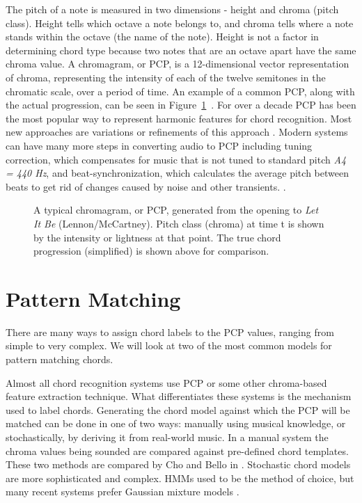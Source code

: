 \documentclass{sig-alternate}
\begin{document}
The pitch of a note is measured in two dimensions - height and chroma (pitch class). Height tells which octave a note belongs to, and chroma tells where a note stands within the octave (the name of the note). Height is not a factor in determining chord type because two notes that are an octave apart have the same chroma value. A chromagram, or PCP, is a 12-dimensional vector representation of chroma, representing the intensity of each of the twelve semitones in the chromatic scale, over a period of time. An example of a common PCP, along with the actual progression, can be seen in Figure~\ref{fig:fig4}~\cite{McVicar:2014}. For over a decade PCP has been the most popular way to represent harmonic features for chord recognition. Most new approaches are variations or refinements of this approach \cite{TaeMin:2014}. Modern systems can have many more steps in converting audio to PCP including tuning correction, which compensates for music that is not tuned to standard pitch \textit{A4 = 440 Hz}, and beat-synchronization, which calculates the average pitch between beats to get rid of changes caused by noise and other transients. \cite{McVicar:2014}.


\begin{figure}
\centering
{}
\caption{A typical chromagram, or PCP, generated from the opening to \textit{Let It Be} (Lennon/McCartney). Pitch class (chroma) at time t is shown by the intensity or lightness at that point. The true chord progression (simplified) is shown above for comparison.}
\label{fig:fig4}
\end{figure}


\section{Pattern Matching}


There are many ways to assign chord labels to the PCP values, ranging from simple to very complex. We will look at two of the most common models for pattern matching chords.

Almost all chord recognition systems use PCP or some other chroma-based feature extraction technique. What differentiates these systems is the mechanism used to label chords. Generating the chord model against which the PCP will be matched can be done in one of two ways: manually using musical knowledge, or stochastically, by deriving it from real-world music. In a manual system the chroma values being sounded are compared against pre-defined chord templates. These two methods are compared by Cho and Bello in  \cite{TaeMin:2014}. Stochastic chord models are more sophisticated and complex. HMMs used to be the method of choice, but many recent systems prefer Gaussian mixture models \cite{TaeMin:2014}.
\end{document}
